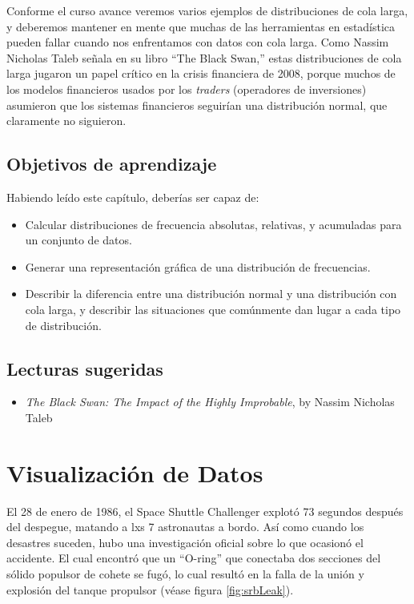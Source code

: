 \documentclass[
  12pt,
]{book}
\providecommand{\tightlist}{%
  \setlength{\itemsep}{0pt}\setlength{\parskip}{0pt}}
\theoremstyle{definition}
\theoremstyle{definition}
\theoremstyle{definition}
\theoremstyle{remark}
\begin{document}
Conforme el curso avance veremos varios ejemplos de distribuciones de cola larga, y deberemos mantener en mente que muchas de las herramientas en estadística pueden fallar cuando nos enfrentamos con datos con cola larga. Como Nassim Nicholas Taleb señala en su libro ``The Black Swan,'' estas distribuciones de cola larga jugaron un papel crítico en la crisis financiera de 2008, porque muchos de los modelos financieros usados por los \emph{traders} (operadores de inversiones) asumieron que los sistemas financieros seguirían una distribución normal, que claramente no siguieron.

\hypertarget{objetivos-de-aprendizaje}{%
\section{Objetivos de aprendizaje}\label{objetivos-de-aprendizaje}}

Habiendo leído este capítulo, deberías ser capaz de:

\begin{itemize}
\tightlist
\item
  Calcular distribuciones de frecuencia absolutas, relativas, y acumuladas para un conjunto de datos.
\item
  Generar una representación gráfica de una distribución de frecuencias.
\item
  Describir la diferencia entre una distribución normal y una distribución con cola larga, y describir las situaciones que comúnmente dan lugar a cada tipo de distribución.
\end{itemize}

\hypertarget{lecturas-sugeridas}{%
\section{Lecturas sugeridas}\label{lecturas-sugeridas}}

\begin{itemize}
\tightlist
\item
  \emph{The Black Swan: The Impact of the Highly Improbable}, by Nassim Nicholas Taleb
\end{itemize}

\hypertarget{data-visualization}{%
\chapter{Visualización de Datos}\label{data-visualization}}

El 28 de enero de 1986, el Space Shuttle Challenger explotó 73 segundos después del despegue, matando a lxs 7 astronautas a bordo. Así como cuando los desastres suceden, hubo una investigación oficial sobre lo que ocasionó el accidente. El cual encontró que un ``O-ring'' que conectaba dos secciones del sólido populsor de cohete se fugó, lo cual resultó en la falla de la unión y explosión del tanque propulsor (véase figura \ref{fig:srbLeak}).
\end{document}
